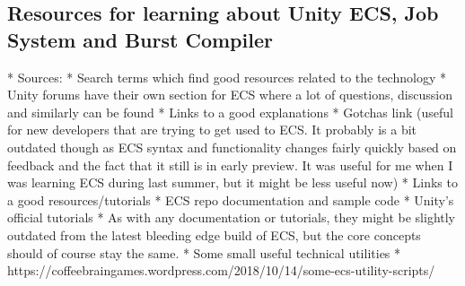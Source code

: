 \subsection{Resources for learning about Unity ECS, Job System and Burst Compiler}
* Sources:
  * Search terms which find good resources related to the technology
     * Unity forums have their own section for ECS where a lot of questions, discussion and similarly can be found
  * Links to a good explanations
     * Gotchas link (useful for new developers that are trying to get used to ECS. It probably is a bit outdated though as ECS syntax and functionality changes fairly quickly based on feedback and the fact that it still is in early preview. It was useful for me when I was learning ECS during last summer, but it might be less useful now)
  * Links to a good resources/tutorials
     * ECS repo documentation and sample code
     * Unity's official tutorials
     * As with any documentation or tutorials, they might be slightly outdated from the latest bleeding edge build of ECS, but the core concepts should of course stay the same. 
     * Some small useful technical utilities
        * https://coffeebraingames.wordpress.com/2018/10/14/some-ecs-utility-scripts/